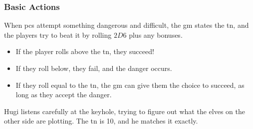 \begin{multicols}{2}

\newcommand{\TNChart}{

  \begin{tabularx}{\linewidth}{cY}

    \textbf{\glsentrytext{tn}} & \textbf{Task} \\\hline

    2 & Automatic \\

    4 & Trivial \\

    6 & Easy \\

    8 & Serious \\

    10 & Professional \\

    12 & Specialist \\

    14 & Extreme \\

    16 & Epic \\

    18 & Legendary \\

    20 & Implausible \\

  \end{tabularx}

}

\subsubsection{Basic Actions}
When \glspl{pc} attempt something dangerous and difficult, the \gls{gm} states the \gls{tn}, and the players try to beat it by rolling $2D6$ plus any bonuses.

\begin{itemize}

  \item
  If the player rolls above the \gls{tn}, they succeed!
  \item
  If they roll below, they fail, and the danger occurs.
  \item
  If they roll equal to the \gls{tn}, the \gls{gm} can give them the choice to succeed, as long as they accept the danger.

\end{itemize}

\begin{exampletext}
  Hugi listens carefully at the keyhole, trying to figure out what the elves on the other side are plotting.
  The \gls{tn} is 10, and he matches it exactly.


\end{exampletext}
\end{multicols}
